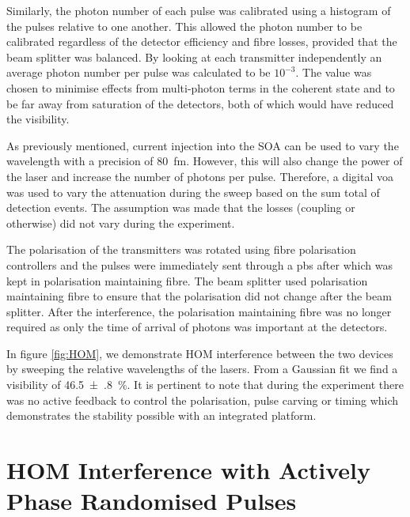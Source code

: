 Similarly, the photon number of each pulse was calibrated using a histogram of the pulses relative to one another. This allowed the photon number to be calibrated regardless of the detector efficiency and fibre losses, provided that the beam splitter was balanced. By looking at each transmitter independently an average photon number per pulse was calculated to be $10^{-3}$. The value was chosen to minimise effects from multi-photon terms in the coherent state and to be far away from saturation of the detectors, both of which would have reduced the visibility.

As previously mentioned, current injection into the \ac{SOA} can be used to vary the wavelength with a precision of \SI{80}{\femto\metre}. However, this will also change the power of the laser and increase the number of photons per pulse. Therefore, a digital \ac{voa} was used to vary the attenuation during the sweep based on the sum total of detection events. The assumption was made that the losses (coupling or otherwise) did not vary during the experiment. 

The polarisation of the transmitters was rotated using fibre polarisation controllers and the pulses were immediately sent through a \ac{pbs} after which was kept in polarisation maintaining fibre. The beam splitter used polarisation maintaining fibre to ensure that the polarisation did not change after the beam splitter. After the interference, the polarisation maintaining fibre was no longer required as only the time of arrival of photons was important at the detectors.

In figure \ref{fig:HOM}, we demonstrate \acl{HOM} interference between the two devices by sweeping the relative wavelengths of the lasers. From a Gaussian fit we find a visibility of \SI{46.5(8)}{\percent}. It is pertinent to note that during the experiment there was no active feedback to control the polarisation, pulse carving or timing which demonstrates the stability possible with an integrated platform. 

\section{HOM Interference with Actively Phase Randomised Pulses}
\label{sec:HOM_random}


